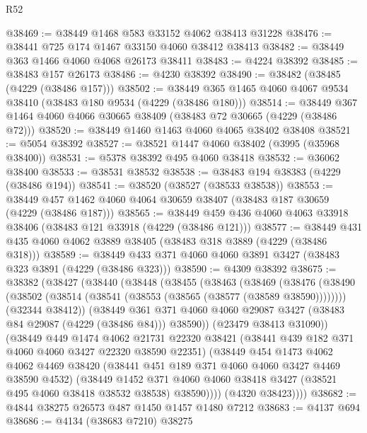 \begin{lexlean}{R52}
\begin{coremodule}
@38469 := @38449 @1468 @583 @33152 @4062 @38413 @31228
@38476 := @38441 @725 @174 @1467 @33150 @4060 @38412 @38413
@38482 := @38449 @363 @1466 @4060 @4068 @26173 @38411
@38483 := @4224 @38392
@38485 := @38483 @157 @26173
@38486 := @4230 @38392
@38490 := @38482 (@38485 (@4229 (@38486 @157)))
@38502 := @38449 @365 @1465 @4060 @4067 @9534 @38410 (@38483 @180 @9534 (@4229 (@38486 @180)))
@38514 := @38449 @367 @1464 @4060 @4066 @30665 @38409 (@38483 @72 @30665 (@4229 (@38486 @72)))
@38520 := @38449 @1460 @1463 @4060 @4065 @38402 @38408
@38521 := @5054 @38392
@38527 := @38521 @1447 @4060 @38402 (@3995 (@35968 @38400))
@38531 := @5378 @38392 @495 @4060 @38418
@38532 := @36062 @38400
@38533 := @38531 @38532
@38538 := @38483 @194 @38383 (@4229 (@38486 @194))
@38541 := @38520 (@38527 (@38533 @38538))
@38553 := @38449 @457 @1462 @4060 @4064 @30659 @38407 (@38483 @187 @30659 (@4229 (@38486 @187)))
@38565 := @38449 @459 @436 @4060 @4063 @33918 @38406 (@38483 @121 @33918 (@4229 (@38486 @121)))
@38577 := @38449 @431 @435 @4060 @4062 @3889 @38405 (@38483 @318 @3889 (@4229 (@38486 @318)))
@38589 := @38449 @433 @371 @4060 @4060 @3891 @3427 (@38483 @323 @3891 (@4229 (@38486 @323)))
@38590 := @4309 @38392
@38675 := @38382
    (@38427
      (@38440
        (@38448
          (@38455
            (@38463
              (@38469
                (@38476
                  (@38490 (@38502 (@38514 (@38541 (@38553 (@38565 (@38577 (@38589 @38590))))))))
                  (@32344 @38412))
                (@38449
                  @361
                  @371
                  @4060
                  @4060
                  @29087
                  @3427
                  (@38483 @84 @29087 (@4229 (@38486 @84)))
                  @38590))
              (@23479 @38413 @31090))
            (@38449
              @449
              @1474
              @4062
              @21731
              @22320
              @38421
              (@38441 @439 @182 @371 @4060 @4060 @3427 @22320 @38590 @22351)
              (@38449
                @454
                @1473
                @4062
                @4062
                @4469
                @38420
                (@38441 @451 @189 @371 @4060 @4060 @3427 @4469 @38590 @4532)
                (@38449
                  @1452
                  @371
                  @4060
                  @4060
                  @38418
                  @3427
                  (@38521 @495 @4060 @38418 @38532 @38538)
                  @38590))))
          (@4320 @38423))))
@38682 := @4844 @38275 @26573 @487 @1450 @1457 @1480 @7212
@38683 := @4137 @694
@38686 := @4134 (@38683 @7210) @38275

\end{coremodule}
\end{lexlean}

